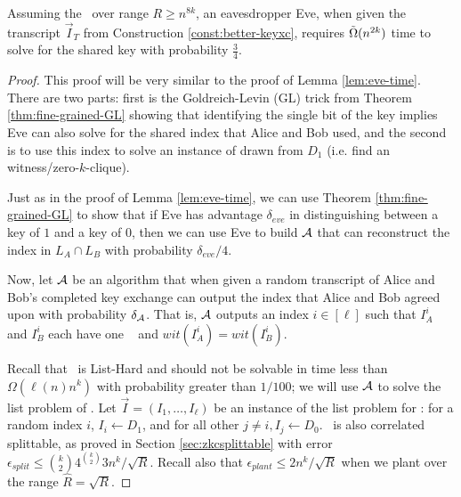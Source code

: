 \begin{lemma}\label{lem:n2-eve-time}
	Assuming the \strongzkc~over range $R \geq n^{8k}$, an eavesdropper Eve, when given the transcript $\vec I_T$ from Construction \ref{const:better-keyxc}, requires $\~\Omega(n^{2k})$ time to solve for the shared key with probability $\frac{3}{4}$.
\end{lemma}
\begin{proof}
	This proof will be very similar to the proof of Lemma \ref{lem:eve-time}. There are two parts: first is the Goldreich-Levin (GL) trick from Theorem \ref{thm:fine-grained-GL} showing that identifying the single bit of the key implies Eve can also solve for the shared index that Alice and Bob used, and the second is to use this index to solve an instance of \zkclique drawn from $D_1$ (i.e. find an witness/zero-$k$-clique).
	
	Just as in the proof of Lemma \ref{lem:eve-time}, we can use Theorem \ref{thm:fine-grained-GL} to show that if Eve has advantage $\delta_{eve}$ in distinguishing between a key of $1$ and a key of $0$, then we can use Eve to build $\cA$ that can reconstruct the index in $L_A \cap L_B$ with probability $\delta_{eve}/4$.
	
	Now, let $\cA$ be an algorithm that when given a random transcript of Alice and Bob's completed key exchange can output the index that Alice and Bob agreed upon with probability $\delta_{\cA}$. That is, $\cA$ outputs an index $i \in [\ell]$ such that $I_A^i$ and $I_B^i$ each have one \zkclique~ and $wit(I_A^i) = wit(I_B^i)$.
	
	Recall that \zkclique~is List-Hard and should not be solvable in time less than $\Omega(\ell(n)n^{k})$ with probability greater than $1/100$; we will use $\cA$ to solve the list problem of \zkclique. Let $\vec I = ( I_1, \ldots, I_\ell )$ be an instance of the list problem for \zkclique: for a random index $i$, $I_i \gets D_1$, and for all other $j \neq i, I_j \gets D_0$.
	\zkclique~is also correlated splittable, as proved in Section \ref{sec:zkcsplittable} with error $\epsilon_{split} \leq \binom{k}{2}4^{\binom{k}{2}}3 n^k/\sqrt{R}$. Recall also that $\epsilon_{plant} \leq 2n^k/\sqrt R$ when we plant over the range $\hat R = \sqrt{R}$.
	

\end{proof}
